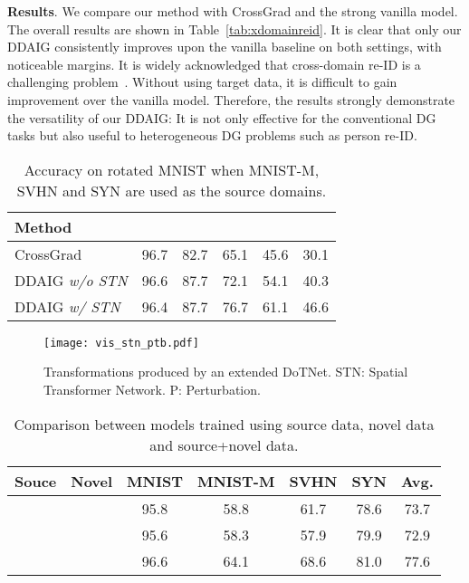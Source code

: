 \documentclass[letterpaper]{article}
\newcommand{\keypoint}[1]{\vspace{0.1cm}\noindent\textbf{#1}}
\newcommand{\tableCellHeight}{1.1}
\begin{document}
\keypoint{Results}.
We compare our method with CrossGrad and the strong vanilla model.
The overall results are shown in Table~\ref{tab:xdomainreid}. It is clear that only our DDAIG consistently improves upon the vanilla baseline on both settings, with noticeable margins.
It is widely acknowledged that cross-domain re-ID is a challenging problem~\cite{zhong2019invariance,zhou2019learning}. Without using target data, it is difficult to gain improvement over the vanilla model. Therefore, the results strongly demonstrate the versatility of our DDAIG: It is not only effective for the conventional DG tasks but also useful to heterogeneous DG problems such as person re-ID.

\begin{table}[t]
    \setlength{\tabcolsep}{7pt}
    \renewcommand{\arraystretch}{\tableCellHeight}
    \centering
    \footnotesize
    \caption{Accuracy on rotated MNIST when MNIST-M, SVHN and SYN are used as the source domains.}
    \label{tab:rotatedMNIST}
    \begin{tabular}{l | c c c c c}
    \hline
    Method &  &  &  &  &  \\
    \hline
    CrossGrad & 96.7 & 82.7 & 65.1 & 45.6 & 30.1 \\
    DDAIG \emph{w/o STN} & 96.6 & 87.7 & 72.1 & 54.1 & 40.3 \\
    DDAIG \emph{w/ STN} & 96.4 & 87.7 & 76.7 & 61.1 & 46.6 \\
    \hline
    \end{tabular}
    \vspace{-0.2cm}
\end{table}

\begin{figure}[t]
\centering
\texttt{[image: vis\_stn\_ptb.pdf]}
\caption{\small Transformations produced by an extended DoTNet. STN: Spatial Transformer Network. P: Perturbation.}
\label{fig:vis_stn_ptb}
\vspace{-0.3cm}
\end{figure}

\begin{table}[t]
\setlength{\tabcolsep}{3.5pt}
\renewcommand{\arraystretch}{\tableCellHeight}
\centering
\footnotesize
\caption{Comparison between models trained using source data, novel data and source+novel data.}
\label{tab:vs_newDataonly}
\begin{tabular}{c c | c c c c c}
\hline
Souce & Novel & MNIST & MNIST-M & SVHN & SYN & Avg. \\
\hline
 & & 95.8 & 58.8 & 61.7 & 78.6 & 73.7 \\ 
 &  & 95.6 & 58.3 & 57.9 & 79.9 & 72.9 \\
 &  & 96.6 & 64.1 & 68.6 & 81.0 & 77.6 \\
\hline
\end{tabular}
\vspace{-0.3cm}
\end{table}
\end{document}

